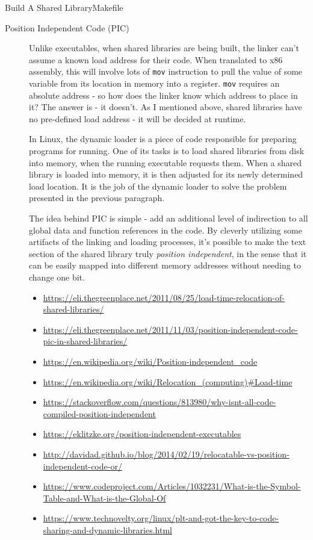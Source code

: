 \begin{frame}{Build A Shared Library}{Makefile}
  \centering
\end{frame}

\begin{description}
\item[Position Independent Code (PIC)] Unlike executables, when shared libraries are being
  built, the linker can't assume a known load address for their code. When translated to
  x86 assembly, this will involve lots of \texttt{mov} instruction to pull the value of
  some variable from its location in memory into a register. \texttt{mov} requires an
  absolute address - so how does the linker know which address to place in it? The answer
  is - it doesn't. As I mentioned above, shared libraries have no pre-defined load address
  - it will be decided at runtime.

  In Linux, the dynamic loader is a piece of code responsible for preparing programs for
  running. One of its tasks is to load shared libraries from disk into memory, when the
  running executable requests them. When a shared library is loaded into memory, it is
  then adjusted for its newly determined load location. It is the job of the dynamic
  loader to solve the problem presented in the previous paragraph.

  The idea behind PIC is simple - add an additional level of indirection to all global
  data and function references in the code. By cleverly utilizing some artifacts of the
  linking and loading processes, it's possible to make the text section of the shared
  library truly \emph{position independent}, in the sense that it can be easily mapped
  into different memory addresses without needing to change one bit.
  \begin{itemize}
  \item
    \url{https://eli.thegreenplace.net/2011/08/25/load-time-relocation-of-shared-libraries/}
  \item
    \url{https://eli.thegreenplace.net/2011/11/03/position-independent-code-pic-in-shared-libraries/}
  \item \url{https://en.wikipedia.org/wiki/Position-independent_code}
  \item \url{https://en.wikipedia.org/wiki/Relocation_(computing)#Load-time}
  \item
    \url{https://stackoverflow.com/questions/813980/why-isnt-all-code-compiled-position-independent}
  \item \url{https://eklitzke.org/position-independent-executables}
  \item
    \url{http://davidad.github.io/blog/2014/02/19/relocatable-vs-position-independent-code-or/}
  \item
    \url{https://www.codeproject.com/Articles/1032231/What-is-the-Symbol-Table-and-What-is-the-Global-Of}
  \item \url{https://www.technovelty.org/linux/plt-and-got-the-key-to-code-sharing-and-dynamic-libraries.html}
  \end{itemize}
\end{description}

